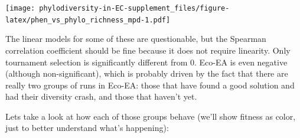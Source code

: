 \documentclass[]{book}
\newenvironment{Shaded}{\begin{snugshade}}{\end{snugshade}}
\newcommand{\DataTypeTok}[1]{\textcolor[rgb]{0.13,0.29,0.53}{#1}}
\newcommand{\DecValTok}[1]{\textcolor[rgb]{0.00,0.00,0.81}{#1}}
\newcommand{\KeywordTok}[1]{\textcolor[rgb]{0.13,0.29,0.53}{\textbf{#1}}}
\newcommand{\NormalTok}[1]{#1}
\newcommand{\OperatorTok}[1]{\textcolor[rgb]{0.81,0.36,0.00}{\textbf{#1}}}
\newcommand{\StringTok}[1]{\textcolor[rgb]{0.31,0.60,0.02}{#1}}
\begin{document}
\texttt{[image: phylodiversity-in-EC-supplement\_files/figure-latex/phen\_vs\_phylo\_richness\_mpd-1.pdf]}

The linear models for some of these are questionable, but the Spearman correlation coefficient should be fine because it does not require linearity. Only tournament selection is significantly different from 0. Eco-EA is even negative (although non-significant), which is probably driven by the fact that there are really two groups of runs in Eco-EA: those that have found a good solution and had their diversity crash, and those that haven't yet.

Lets take a look at how each of those groups behave (we'll show fitness as color, just to better understand what's happening):

\begin{Shaded}
\end{Shaded}
\end{document}
